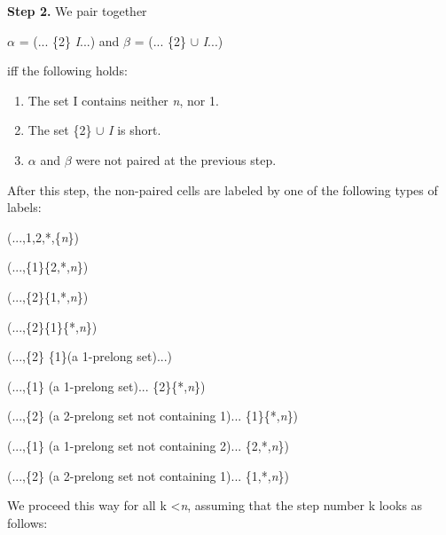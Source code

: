 \documentclass{amsart}
\begin{document}
\textbf{Step 2.} We pair together
\begin{center}
$\alpha$ = (... \{2\} \textit{I}...) and $\beta$ = (... \{2\} $\cup$ \textit{I}...)
\end{center}
iff the following holds:
\begin{enumerate}
\item The set I contains neither \textit{n}, nor 1.
\item The set \{2\} $\cup$ \textit{I} is short.
\item $\alpha$ and $\beta$ were not paired at the previous step.
\end{enumerate}
After this step, the non-paired cells are labeled by one of the following types of labels: 

\begin{center}
(...,1,2,*,\{\textit{n}\})
\end{center}

\begin{center}
(...,\{1\}\{2,*,\textit{n}\})
\end{center}

\begin{center}
(...,\{2\}\{1,*,\textit{n}\})
\end{center}

\begin{center}
(...,\{2\}\{1\}\{*,\textit{n}\})
\end{center}

\begin{center}
(...,\{2\} \{1\}(a 1-prelong set)...)
\end{center}

\begin{center}
(...,\{1\} (a 1-prelong set)... \{2\}\{*,\textit{n}\})
\end{center}

\begin{center}
(...,\{2\} (a 2-prelong set not containing 1)... \{1\}\{*,\textit{n}\})
\end{center}

\begin{center}
(...,\{1\} (a 1-prelong set not containing 2)... \{2,*,\textit{n}\})
\end{center}

\begin{center}
(...,\{2\} (a 2-prelong set not containing 1)... \{1,*,\textit{n}\})
\end{center}

We proceed this way for all k \textless \textit{n}, assuming that the step number k looks
as follows:
\end{document}
